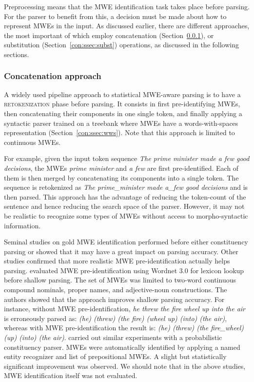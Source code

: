\documentclass[output=paper]{langsci/langscibook}
\begin{document}
Preprocessing means that the MWE identification task takes place before parsing. For the parser to benefit from this, a decision must be made about how to represent MWEs in the input. As discussed earlier, there are different approaches, the most important of which  employ concatenation (Section~\ref{con:ssec:concat}), or substitution (Section~\ref{con:ssec:subst}) operations, as discussed in the following sections.

\subsubsection{Concatenation approach}
\label{con:ssec:concat}

A widely used pipeline approach to statistical MWE-aware parsing is to have a \textsc{retokenization} phase before parsing. It consists in first pre-identifying MWEs, then concatenating their components in one single token, and finally applying  a syntactic parser trained on a treebank where MWEs have a words-with-spaces representation (Section~\ref{con:ssec:wws}). Note that this approach is limited to continuous MWEs. 

For example, given the input token sequence \textit{The prime minister made a few good decisions}, the MWEs \textit{prime minister} and \textit{a few} are first pre-identified. Each of them is then merged by concatenating its components into a single token. The sequence is retokenized as \textit{The prime\_minister made a\_few good decisions} and is then parsed.
This approach has the advantage of reducing the token-count of the sentence and hence reducing the search space of the parser. However, it may not be realistic to recognize some types of MWEs without access to morpho-syntactic information.

Seminal studies 
on gold MWE identification performed before either consti\-tuency parsing \citep{arun05} or  \citep{nivre04,eryigit:2011:multiword} showed that it may have a great impact on parsing accuracy.
Other studies confirmed that more realistic MWE pre-identification actually helps parsing. 
\citet{korkontzelosetal2010} evaluated MWE pre-iden\-ti\-fi\-ca\-tion using Wordnet 3.0 for lexicon lookup before shallow parsing. The set of MWEs was limited to two-word continuous compound nominals, proper names, and adjective-noun constructions. The authors showed that the approach improves shallow parsing accuracy. For instance, 
without  MWE pre-identification,
\textit{he threw the fire wheel up into the air} is erroneously parsed as: \textit{(he) (threw) (the fire) (wheel up) (into) (the air)}, whereas with MWE pre-identification the result is: \textit{(he) (threw) (the fire\_wheel) (up) (into) (the air)}. \citet{cafferkey07} carried out similar experiments with a probabilistic constituency parser. MWEs were automatically identified by applying a named entity recognizer and list of prepositional MWEs. A slight but statistically significant improvement was observed. We should note that in the above studies, MWE identification itself was not evaluated. 
\end{document}
